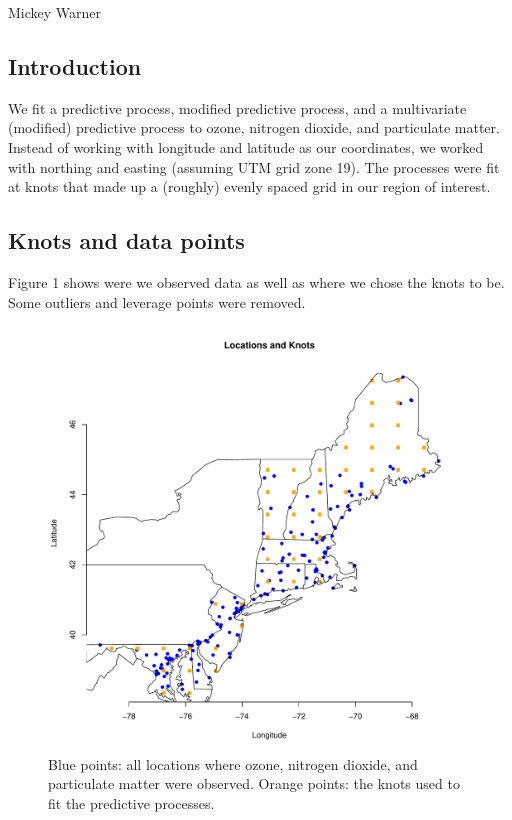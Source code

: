 \documentclass[12pt]{article}
\begin{document}
Mickey Warner
\bigskip

\subsection*{Introduction}

We fit a predictive process, modified predictive process, and a multivariate (modified) predictive process to ozone, nitrogen dioxide, and particulate matter. Instead of working with longitude and latitude as our coordinates, we worked with northing and easting (assuming UTM grid zone 19). The processes were fit at knots that made up a (roughly) evenly spaced grid in our region of interest.

\subsection*{Knots and data points}

Figure 1 shows were we observed data as well as where we chose the knots to be. Some outliers and leverage points were removed.

\begin{figure}[ht]
\begin{center}
\includegraphics[scale=0.5]{figs/knots.pdf}
\end{center}
\caption{Blue points: all locations where ozone, nitrogen dioxide, and particulate matter were observed. Orange points: the knots used to fit the predictive processes.}
\end{figure}
\end{document}
